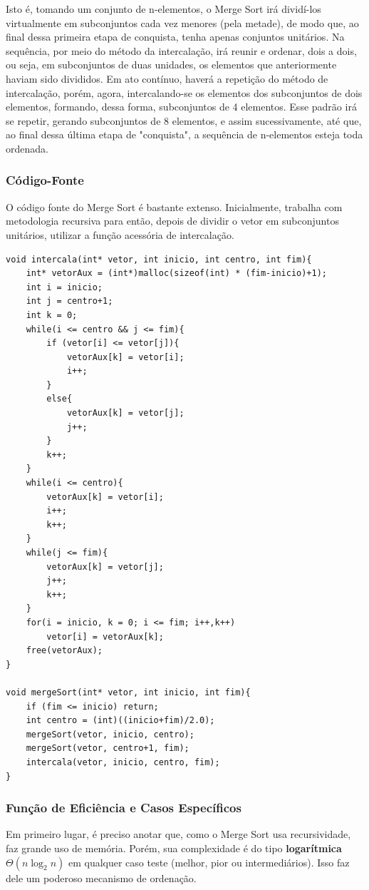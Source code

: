 \documentclass[a4paper, 12pt]{article}
\begin{document}
Isto é, tomando um conjunto de n-elementos, o Merge Sort irá dividí-los virtualmente em subconjuntos cada vez menores (pela metade), de modo que, ao final dessa primeira etapa de conquista, tenha apenas conjuntos unitários. Na sequência, por meio do método da intercalação, irá reunir e ordenar, dois a dois, ou seja, em subconjuntos de duas unidades, os elementos que anteriormente haviam sido divididos. Em ato contínuo, haverá a repetição do método de intercalação, porém, agora, intercalando-se os elementos dos subconjuntos de dois elementos, formando, dessa forma, subconjuntos de 4 elementos. Esse padrão irá se repetir, gerando subconjuntos de 8 elementos, e assim sucessivamente, até que, ao final dessa última etapa de "conquista", a sequência de n-elementos esteja toda ordenada.

\subsubsection{Código-Fonte}
O código fonte do Merge Sort é bastante extenso. Inicialmente, trabalha com metodologia recursiva para então, depois de dividir o vetor em subconjuntos unitários, utilizar a função acessória de intercalação.

\begin{verbatim}
void intercala(int* vetor, int inicio, int centro, int fim){
    int* vetorAux = (int*)malloc(sizeof(int) * (fim-inicio)+1);
    int i = inicio;
    int j = centro+1;
    int k = 0;
    while(i <= centro && j <= fim){
        if (vetor[i] <= vetor[j]){ 
            vetorAux[k] = vetor[i];
            i++; 
        }
        else{
            vetorAux[k] = vetor[j];
            j++;
        }
        k++;
    }
    while(i <= centro){
        vetorAux[k] = vetor[i];
        i++;
        k++;
    }
    while(j <= fim){
        vetorAux[k] = vetor[j];
        j++;
        k++;
    }
    for(i = inicio, k = 0; i <= fim; i++,k++)
        vetor[i] = vetorAux[k];
    free(vetorAux);
}

void mergeSort(int* vetor, int inicio, int fim){
    if (fim <= inicio) return;
    int centro = (int)((inicio+fim)/2.0);
    mergeSort(vetor, inicio, centro);
    mergeSort(vetor, centro+1, fim);
    intercala(vetor, inicio, centro, fim);
}
\end{verbatim}

\subsubsection{Função de Eficiência e Casos Específicos}
\tab Em primeiro lugar, é preciso anotar que, como o Merge Sort usa 
recursividade, faz grande uso de memória. Porém, sua complexidade é do tipo 
\textbf{logarítmica} $\varTheta (n\log_{2}n)$ em qualquer caso teste (melhor, pior 
ou intermediários). Isso faz dele um poderoso mecanismo de 
ordenação.
\end{document}
